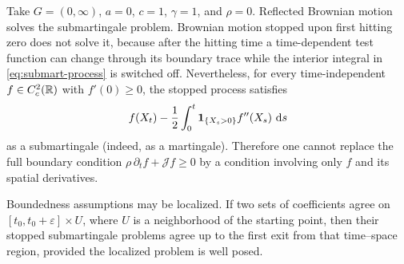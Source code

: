 \begin{example}
Take $G=(0,\infty)$, $a=0$, $c=1$, $\gamma=1$, and $\rho=0$.
Reflected Brownian motion solves the submartingale problem. Brownian motion
stopped upon first hitting zero does not solve it, because after the hitting
time a time-dependent test function can change through its boundary trace
while the interior integral in \eqref{eq:submart-process} is switched off.
Nevertheless, for every time-independent
$f\in C_c^2(\mathbb R)$ with $f'(0)\geq0$, the stopped process satisfies
\[
  f(X_t)-\frac12\int_0^t\mathbf 1_{\{X_s>0\}}f''(X_s)\,\mathop{}\!\mathrm d s
\]
as a submartingale (indeed, as a martingale). Therefore one cannot replace
the full boundary condition
$\rho\,\partial_t f+\mathcal Jf\geq0$ by a condition involving only
$f$ and its spatial derivatives.
\end{example}

\begin{remark}[Localization]
Boundedness assumptions may be localized. If two sets of coefficients agree
on $[t_0,t_0+\varepsilon]\times U$, where $U$ is a neighborhood of the
starting point, then their stopped submartingale problems agree up to the
first exit from that time--space region, provided the localized problem is
well posed.
\end{remark}
